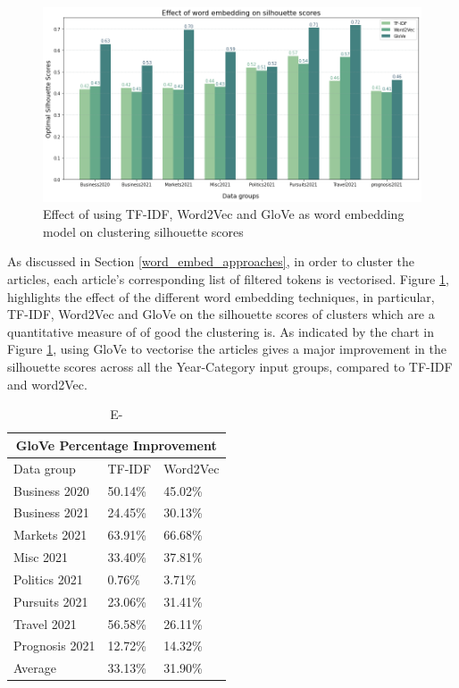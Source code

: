 \begin{figure}[H]
\centering
\includegraphics[width=0.7\linewidth]{images/eval/word_embedding.png}
\caption{Effect of using TF-IDF, Word2Vec and GloVe as word embedding model on clustering silhouette scores}
\label{fig:word_embed}
\end{figure}
\vspace{-1em}
As discussed in Section \ref{word_embed_approaches}, in order to cluster the articles, each article's corresponding list of filtered tokens is vectorised. Figure \ref{fig:word_embed}, highlights the effect of the different word embedding techniques, in particular, TF-IDF, Word2Vec and GloVe on the silhouette scores of clusters which are a quantitative measure of of good the clustering is. As indicated by the chart in Figure \ref{fig:word_embed}, using GloVe to vectorise the articles gives a major improvement in the silhouette scores across all the Year-Category input groups, compared to TF-IDF and word2Vec.

\begin{table}[H]
\centering
\renewcommand{\arraystretch}{1.05}
\begin{tabularx}{0.7\textwidth}{X X X} 
\multicolumn{3}{c}{GloVe Percentage Improvement} \\
 \hline
 Data group & TF-IDF & Word2Vec \\
 \hline
 Business 2020 & 50.14\% & 45.02\%  \\ 
 Business 2021 & 24.45\% & 30.13\%  \\
 Markets 2021 & 63.91\% & 66.68\% \\
 Misc 2021 & 33.40\% & 37.81\% \\
 Politics 2021 & 0.76\% & 3.71\% \\
 Pursuits 2021 & 23.06\% & 31.41\%  \\ 
 Travel 2021 & 56.58\% & 26.11\% \\
 Prognosis 2021 & 12.72\% & 14.32\% \\ 
 \hline
 Average & 33.13\% & 31.90\% \\ 
\end{tabularx}
\caption{E-}
\label{table:word_embed}
\end{table}
\vspace{-1em}

